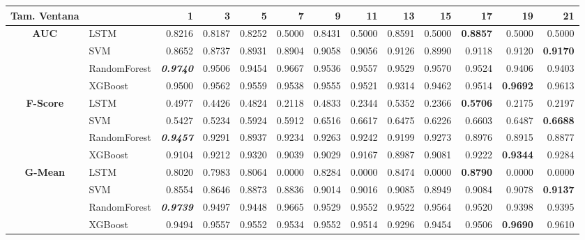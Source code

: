 \begin{table}[H]
	\centering
	\begin{adjustbox}{max width=14cm}
		\begin{tabular}{|c|l|r|r|r|r|r|r|r|r|r|r|r|}
			\hline
			\textbf{Tam. Ventana}&         &      1  &      3  &      5  &      7  &      9  &      11 &      13 &      15 &      17 &      19 &      21 \\
			\hline
			\textbf{AUC} &  LSTM &  0.8216 &  0.8187 &  0.8252 &  0.5000 &  0.8431 &  0.5000 &  0.8591 &  0.5000 & \textbf{  0.8857 } &  0.5000 &  0.5000 \\
			&  SVM &  0.8652 &  0.8737 &  0.8931 &  0.8904 &  0.9058 &  0.9056 &  0.9126 &  0.8990 &  0.9118 &  0.9120 & \textbf{  0.9170 } \\
			&  RandomForest & \textit{ \textbf{  0.9740 } } &  0.9506 &  0.9454 &  0.9667 &  0.9536 &  0.9557 &  0.9529 &  0.9570 &  0.9524 &  0.9406 &  0.9403 \\
			&  XGBoost &  0.9500 &  0.9562 &  0.9559 &  0.9538 &  0.9555 &  0.9521 &  0.9314 &  0.9462 &  0.9514 & \textbf{  0.9692 } &  0.9613 \\
			\hline
			\textbf{F-Score} &  LSTM &  0.4977 &  0.4426 &  0.4824 &  0.2118 &  0.4833 &  0.2344 &  0.5352 &  0.2366 & \textbf{  0.5706 } &  0.2175 &  0.2197 \\
			&  SVM &  0.5427 &  0.5234 &  0.5924 &  0.5912 &  0.6516 &  0.6617 &  0.6475 &  0.6226 &  0.6603 &  0.6487 & \textbf{  0.6688 } \\
			&  RandomForest & \textit{ \textbf{  0.9457 } } &  0.9291 &  0.8937 &  0.9234 &  0.9263 &  0.9242 &  0.9199 &  0.9273 &  0.8976 &  0.8915 &  0.8877 \\
			&  XGBoost &  0.9104 &  0.9212 &  0.9320 &  0.9039 &  0.9029 &  0.9167 &  0.8987 &  0.9081 &  0.9222 & \textbf{  0.9344 } &  0.9284 \\
			\hline
			\textbf{G-Mean} &  LSTM &  0.8020 &  0.7983 &  0.8064 &  0.0000 &  0.8284 &  0.0000 &  0.8474 &  0.0000 & \textbf{  0.8790 } &  0.0000 &  0.0000 \\
			&  SVM &  0.8554 &  0.8646 &  0.8873 &  0.8836 &  0.9014 &  0.9016 &  0.9085 &  0.8949 &  0.9084 &  0.9078 & \textbf{  0.9137 } \\
			&  RandomForest & \textit{ \textbf{  0.9739 } } &  0.9497 &  0.9448 &  0.9665 &  0.9529 &  0.9552 &  0.9522 &  0.9564 &  0.9520 &  0.9398 &  0.9395 \\
			&  XGBoost &  0.9494 &  0.9557 &  0.9552 &  0.9534 &  0.9552 &  0.9514 &  0.9296 &  0.9454 &  0.9506 & \textbf{  0.9690 } &  0.9610 \\

\end{tabular}
\end{adjustbox}
\end{table}
